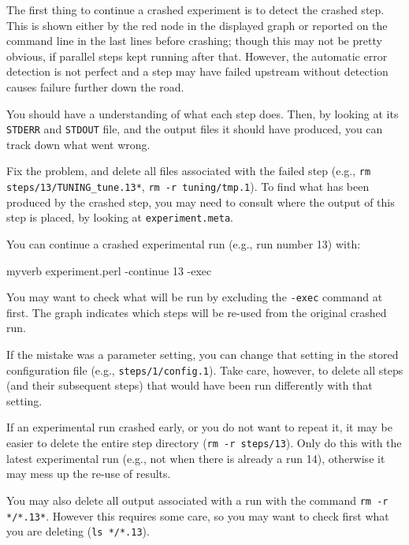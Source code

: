 The first thing to continue a crashed experiment is to detect the crashed step. This is shown either by the red node in the displayed graph or reported on the command line in the last lines before crashing; though this may not be pretty obvious, if parallel steps kept running after that. However, the automatic error detection is not perfect and a step may have failed upstream without detection causes failure further down the road.



You should have a understanding of what each step does. Then, by looking at its {\tt STDERR} and {\tt STDOUT} file, and the output files it should have produced, you can track down what went wrong.



Fix the problem, and delete all files associated with the failed step (e.g., {\tt rm steps/13/TUNING\_tune.13*}, {\tt rm -r tuning/tmp.1}). To find what has been produced by the crashed step, you may need to consult where the output of this step is placed, by looking at  {\tt experiment.meta}.



You can continue a crashed experimental run (e.g., run number 13) with:

\begin{SaveVerbatim}{myverb}
 experiment.perl -continue 13 -exec
\end{SaveVerbatim}
\colorbox{gray}{%
}

You may want to check what will be run by excluding the {\tt -exec} command at first. The graph indicates which steps will be re-used from the original crashed run.



If the mistake was a parameter setting, you can change that setting in the stored configuration file (e.g., {\tt steps/1/config.1}). Take care, however, to delete all steps (and their subsequent steps) that would have been run differently with that setting.



If an experimental run crashed early, or you do not want to repeat it, it may be easier to delete the entire step directory ({\tt rm -r steps/13}). Only do this with the latest experimental run (e.g., not when there is already a run 14), otherwise it may mess up the re-use of results. 



You may also delete all output associated with a run with the command {\tt rm -r */*.13*}. However this requires some care, so you may want to check first what you are deleting ({\tt ls */*.13}).  



